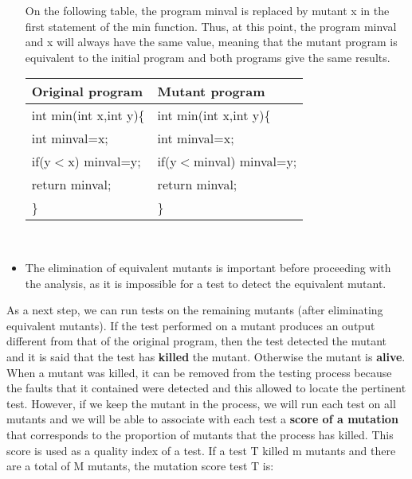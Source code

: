 \documentclass{acm_proc_article-sp}
\begin{document}
\begin{itemize}
On the following table, the program minval is replaced by mutant x in the first statement of the min function. Thus, at this point, the program minval and x will always have the same value, meaning that the mutant program is equivalent to the initial program and both programs give the same results.\\
\begin{center}
\begin{tabular}{|l|l|}
\hline Original program & Mutant program \\
\hline int min(int x,int y)\{ & int min(int x,int y)\{\\
        int minval=x; &   int minval=x; \\
        if(y$<$x) minval=y;  &  if(y$<$minval) minval=y;\\
        return minval;  &  return minval;\\
       \} & \}\\ \hline
\end{tabular} \vspace{0.3cm} \\
\end{center}
 \item The elimination of equivalent mutants is important before proceeding with the analysis, as it is impossible for a test to detect the equivalent mutant.
\end{itemize}
As a next step, we can run tests on the remaining mutants (after eliminating equivalent mutants). If the test performed on a mutant produces an output different from that of the original program, then the test detected the mutant and it is said that the test has \textbf{killed} the mutant. Otherwise the mutant is \textbf{alive}.\\
When a mutant was killed, it can be removed from the testing process because the faults that it contained were detected and this allowed to locate the pertinent test. However, if we keep the mutant in the process, we will run each test on all mutants and we will be able to associate with each test a \textbf{score of a mutation} that corresponds to the proportion of mutants that the process has killed. This score is used as a quality index of a test. If a test T killed m mutants and there are a total of M mutants, the mutation score test T is:
\begin{center}
\end{center}
\end{document}
